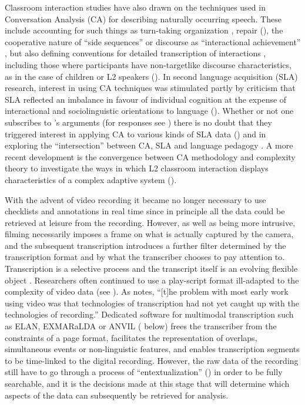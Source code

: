 \documentclass[output=paper,colorlinks,citecolor=brown,modfonts,nonflat]{../langscibook}
\begin{document}
Classroom interaction studies have also drawn on the techniques used in Conversation Analysis (CA) for describing naturally occurring speech. These include accounting for such things as turn-taking organization \citep{SacksEtAl1974}, repair (\citealt{SchegloffEtAl1977, Schegloff2000}), the cooperative nature of “side sequences” \citep{Jefferson1972} or discourse as “interactional achievement” \citep{Schegloff1982}, but also defining conventions for detailed transcription of interactions \citep{Jefferson2004}, including those where participants have non-targetlike discourse characteristics, as in the case of children \citep{Ochs1979} or L2 speakers (\citealt{Jefferson1983, Jefferson1996}). In second language acquisition (SLA) research, interest in using CA techniques was stimulated partly by criticism that SLA reflected an imbalance in favour of individual cognition at the expense of interactional and sociolinguistic orientations to language (\citealt{FirthWagner1997}). Whether or not one subscribes to \citeauthor{FirthWagner1997}’s arguments (for responses see \citealt{Kasper1997,Poulisse1997,Long1997,Gass1998}) there is no doubt that they triggered interest in applying CA to various kinds of SLA data (\citealt{Markee2000,Seedhouse2004, Seedhouse2005}) and in exploring the “intersection” between CA, SLA and language pedagogy \citep{Mori2007}. A more recent development is the convergence between CA methodology and complexity theory to investigate the ways in which L2 classroom interaction displays characteristics of a complex adaptive system (\citealt{Seedhouse2010, Seedhouse2015}).

With the advent of video recording it became no longer necessary to use checklists and annotations in real time since in principle all the data could be retrieved at leisure from the recording. However, as well as being more intrusive, filming necessarily imposes a frame on what is actually captured by the camera, and the subsequent transcription introduces a further filter determined by the transcription format and by what the transcriber chooses to pay attention to. Transcription is a selective process \citep{Ochs1979} and the transcript itself is an evolving flexible object \citep{Mondada2007}. Researchers often continued to use a play-script format ill-adapted to the complexity of video data (see \citealt{Erickson2004}). As \citet[17]{Jones2013} notes, “[t]he problem with most early work using video was that technologies of transcription had not yet caught up with the technologies of recording.” Dedicated software for multimodal transcription such as ELAN, EXMARaLDA or ANVIL ( below) frees the transcriber from the constraints of a page format, facilitates the representation of overlaps, simultaneous events or non-linguistic features, and enables transcription segments to be time-linked to the digital recording. However, the raw data of the recording still have to go through a process of “entextualization” (\citealt{BaumanBriggs1990}) in order to be fully searchable, and it is the decisions made at this stage that will determine which aspects of the data can subsequently be retrieved for analysis. 
\end{document}
